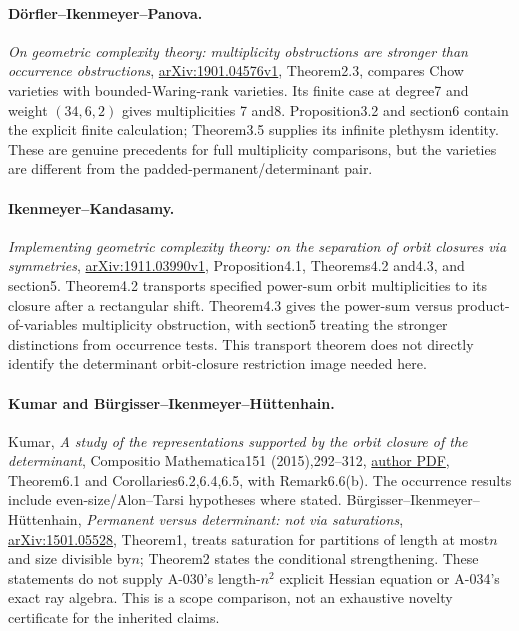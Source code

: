 \paragraph{D\"orfler--Ikenmeyer--Panova.}
\emph{On geometric complexity theory: multiplicity obstructions are
stronger than occurrence obstructions},
\href{https://arxiv.org/abs/1901.04576}{arXiv:1901.04576v1},
Theorem2.3, compares Chow varieties with bounded-Waring-rank varieties.
Its finite case at degree7 and weight $(34,6,2)$ gives multiplicities
7 and8. Proposition3.2 and section6 contain the explicit finite
calculation; Theorem3.5 supplies its infinite plethysm identity.
These are genuine precedents for full multiplicity comparisons, but
the varieties are different from the padded-permanent/determinant pair.

\paragraph{Ikenmeyer--Kandasamy.}
\emph{Implementing geometric complexity theory: on the separation of
orbit closures via symmetries},
\href{https://arxiv.org/abs/1911.03990}{arXiv:1911.03990v1},
Proposition4.1, Theorems4.2 and4.3, and section5.
Theorem4.2 transports specified power-sum orbit multiplicities to its
closure after a rectangular shift. Theorem4.3 gives the power-sum versus
product-of-variables multiplicity obstruction, with section5 treating
the stronger distinctions from occurrence tests. This transport theorem
does not directly identify the determinant orbit-closure restriction
image needed here.

\paragraph{Kumar and B\"urgisser--Ikenmeyer--H\"uttenhain.}
Kumar, \emph{A study of the representations supported by the orbit
closure of the determinant}, Compositio Mathematica151 (2015),292--312,
\href{https://kumar.math.unc.edu/papers/kumar67.pdf}{author PDF},
Theorem6.1 and Corollaries6.2,6.4,6.5, with Remark6.6(b).
The occurrence results include even-size/Alon--Tarsi hypotheses where
stated. B\"urgisser--Ikenmeyer--H\"uttenhain,
\emph{Permanent versus determinant: not via saturations},
\href{https://arxiv.org/abs/1501.05528}{arXiv:1501.05528},
Theorem1, treats saturation for partitions of length at most$n$ and
size divisible by$n$; Theorem2 states the conditional strengthening.
These statements do not supply A-030's length-$n^2$ explicit Hessian
equation or A-034's exact ray algebra. This is a scope comparison,
not an exhaustive novelty certificate for the inherited claims.

